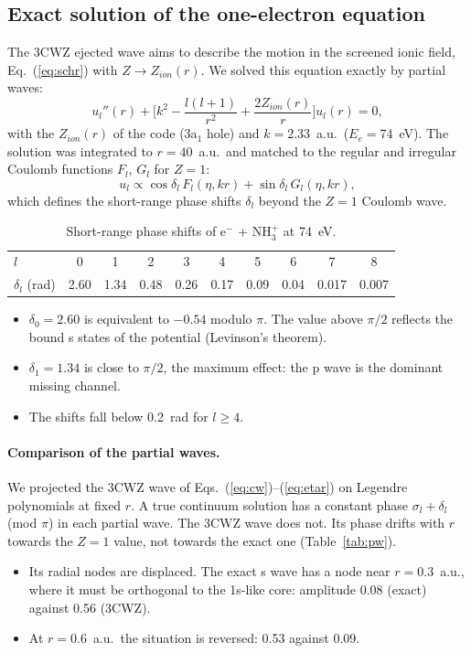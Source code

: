 \documentclass[11pt,a4paper]{article}
\newcommand{\aone}{3a$_1$}
\begin{document}
\subsection{Exact solution of the one-electron equation}
The 3CWZ ejected wave aims to describe the motion in the screened ionic field,
Eq.~(\ref{eq:schr}) with $Z\to Z_{ion}(r)$. We solved this equation exactly by partial waves:
\begin{equation}
u_l''(r)+\Big[k^2-\frac{l(l+1)}{r^2}+\frac{2Z_{ion}(r)}{r}\Big]u_l(r)=0 ,
\end{equation}
with the $Z_{ion}(r)$ of the code (\aone{} hole) and $k=2.33$~a.u.\ ($E_e=74$~eV). The solution was
integrated to $r=40$~a.u.\ and matched to the regular and irregular Coulomb functions $F_l$,
$G_l$ for $Z=1$:
\begin{equation}
u_l\propto\cos\delta_l\,F_l(\eta,kr)+\sin\delta_l\,G_l(\eta,kr),
\end{equation}
which defines the short-range phase shifts $\delta_l$ beyond the $Z=1$ Coulomb wave.

\begin{table}[H]\centering\small
\caption{Short-range phase shifts of e$^-$ + NH$_3^+$ at 74~eV.}\label{tab:delta}
\begin{tabular}{lccccccccc}\toprule
$l$ & 0 & 1 & 2 & 3 & 4 & 5 & 6 & 7 & 8\\
$\delta_l$ (rad) & 2.60 & 1.34 & 0.48 & 0.26 & 0.17 & 0.09 & 0.04 & 0.017 & 0.007\\\bottomrule
\end{tabular}
\end{table}

\begin{itemize}
\item $\delta_0=2.60$ is equivalent to $-0.54$ modulo $\pi$. The value above $\pi/2$ reflects the
  bound s states of the potential (Levinson's theorem).
\item $\delta_1=1.34$ is close to $\pi/2$, the maximum effect: the p wave is the dominant missing
  channel.
\item The shifts fall below 0.2~rad for $l\ge4$.
\end{itemize}

\paragraph{Comparison of the partial waves.} We projected the 3CWZ wave of
Eqs.~(\ref{eq:cw})--(\ref{eq:etar}) on Legendre polynomials at fixed $r$. A true continuum
solution has a constant phase $\sigma_l+\delta_l$ (mod $\pi$) in each partial wave. The 3CWZ
wave does not. Its phase drifts with $r$ towards the $Z=1$ value, not towards the exact one
(Table~\ref{tab:pw}).
\begin{itemize}
\item Its radial nodes are displaced. The exact s wave has a node near $r=0.3$~a.u., where it must
  be orthogonal to the 1s-like core: amplitude 0.08 (exact) against 0.56 (3CWZ).
\item At $r=0.6$~a.u.\ the situation is reversed: 0.53 against 0.09.
\end{itemize}
\end{document}
